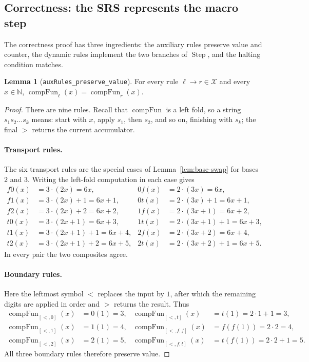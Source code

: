\documentclass[11pt,a4paper]{article}
\theoremstyle{definition}
\newtheorem{lemma}[definition]{Lemma}
\newcommand{\lt}{<}
\newcommand{\gt}{>}
\newcommand{\Nat}{\mathbb{N}}
\newcommand{\compFun}{\operatorname{compFun}}
\newcommand{\auxRules}{\mathcal{X}}
\newcommand{\macroStep}{\operatorname{Step}}
\begin{document}
\subsection{Correctness: the SRS represents the macro step}
\label{subsec:lean-correctness}

The correctness proof has three ingredients: the auxiliary rules
preserve value and counter, the dynamic rules implement the two branches
of $\macroStep$, and the halting condition matches.

\begin{lemma}[\texttt{auxRules\_preserve\_value}]
  \label{lem:aux-value}
  For every rule $\ell\to r\in\auxRules$ and every $x\in\Nat$,
  $\compFun_\ell(x)=\compFun_r(x)$.
\end{lemma}
\begin{proof}
  There are nine rules.  Recall that $\compFun$ is a left fold, so a
  string $s_1s_2\dots s_k$ means: start with $x$, apply $s_1$, then
  $s_2$, and so on, finishing with $s_k$; the final $\gt$ returns the
  current accumulator.

  \paragraph{Transport rules.}  The six transport rules are the special
  cases of Lemma~\ref{lem:base-swap} for bases $2$ and $3$.  Writing the
  left-fold computation in each case gives
  \[
    \begin{aligned}
      f0(x)&=3\cdot(2x)=6x,            & 0f(x)&=2\cdot(3x)=6x,\\
      f1(x)&=3\cdot(2x)+1=6x+1,        & 0t(x)&=2\cdot(3x)+1=6x+1,\\
      f2(x)&=3\cdot(2x)+2=6x+2,        & 1f(x)&=2\cdot(3x+1)=6x+2,\\
      t0(x)&=3\cdot(2x+1)=6x+3,        & 1t(x)&=2\cdot(3x+1)+1=6x+3,\\
      t1(x)&=3\cdot(2x+1)+1=6x+4,      & 2f(x)&=2\cdot(3x+2)=6x+4,\\
      t2(x)&=3\cdot(2x+1)+2=6x+5,      & 2t(x)&=2\cdot(3x+2)+1=6x+5.
    \end{aligned}
  \]
  In every pair the two composites agree.

  \paragraph{Boundary rules.}  Here the leftmost symbol $\lt$ replaces
  the input by $1$, after which the remaining digits are applied in order
  and $\gt$ returns the result.  Thus
  \[
    \begin{aligned}
      \compFun_{[\lt,0]}(x)&=0(1)=3,        &
      \compFun_{[\lt,t]}(x)&=t(1)=2\cdot1+1=3,\\
      \compFun_{[\lt,1]}(x)&=1(1)=4,        &
      \compFun_{[\lt,f,f]}(x)&=f(f(1))=2\cdot2=4,\\
      \compFun_{[\lt,2]}(x)&=2(1)=5,        &
      \compFun_{[\lt,f,t]}(x)&=t(f(1))=2\cdot2+1=5.
    \end{aligned}
  \]
  All three boundary rules therefore preserve value.
\end{proof}
\end{document}
